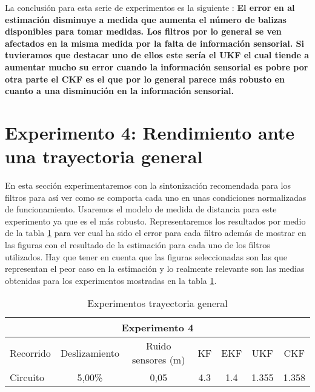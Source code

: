 La conclusión para esta serie de experimentos es la siguiente : \textbf{El error en al estimación disminuye a medida que aumenta el número de balizas disponibles para tomar medidas. Los filtros por lo general se ven afectados en la misma medida por la falta de información sensorial. Si tuvieramos que destacar uno de ellos este sería el \ac{UKF} el cual tiende a aumentar mucho su error cuando la información sensorial es pobre por otra parte el \ac{CKF} es el que por lo general parece más robusto en cuanto a una disminución en la información sensorial.}
%
%
%

\section{Experimento 4: Rendimiento ante una trayectoria general}%
%
%
%
En esta sección experimentaremos con la sintonización recomendada para los filtros para así  ver como se comporta cada uno en unas condiciones normalizadas de funcionamiento.
%
%
%
Usaremos el modelo de medida de distancia para este experimento ya que es el más robusto.
Representaremos los resultados por medio de la tabla \ref{Exp_trayectoria_general} para ver cual ha sido el error para cada filtro además de mostrar en las figuras con  el resultado de la estimación para cada uno de los filtros utilizados.
Hay que tener en cuenta que las figuras seleccionadas son las que representan el peor caso en la estimación y lo realmente relevante son las medias obtenidas para los experimentos mostradas en la tabla \ref{Exp_trayectoria_general}.

\begin{table}[htbp]
\caption{Experimentos trayectoria general}
\begin{center}
\begin{tabular}{|l|c|c|l|c|c|c|c|}
\hline
\multicolumn{ 8}{|c|}{Experimento 4} \\ \hline
Recorrido & Deslizamiento & \multicolumn{ 2}{c|}{Ruido sensores (m)} & KF & EKF & UKF & CKF \\ \hline
Circuito  & 5,00\% & \multicolumn{ 2}{c|}{0,05} & 4.3& 1.4 & 1.355 &1.358 \\ \hline
\end{tabular}
\end{center}
\label{Exp_trayectoria_general}
\end{table}

